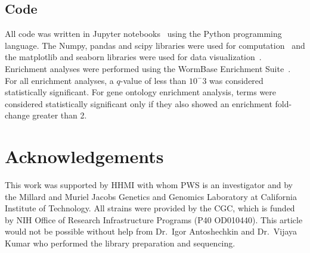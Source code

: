 \documentclass[10pt, twocolumn]{article}
\begin{document}
\subsection*{Code}
All code was written in Jupyter notebooks~\cite{Perez2007} using the Python
programming language. The Numpy, pandas and scipy libraries were used for
computation~\cite{VanDerWalt2011,McKinney2011,Oliphant2007} and the matplotlib
and seaborn libraries were used for data visualization~\cite{Hunter2007,Waskom}.
Enrichment analyses were performed using the WormBase Enrichment
Suite~\cite{Angeles-Albores2016}. For all enrichment analyses, a $q$-value of
less than $10^-3$ was considered statistically significant. For gene ontology
enrichment analysis, terms were considered statistically significant only if
they also showed an enrichment fold-change greater than 2.

\section*{Acknowledgements}
This work was supported by HHMI with whom PWS is an investigator and by the
Millard and Muriel Jacobs Genetics and Genomics Laboratory at California
Institute of Technology. All strains were provided by the CGC, which is funded
by NIH Office of Research Infrastructure Programs (P40 OD010440). This article
would not be possible without help from Dr.\ Igor Antoshechkin and Dr.\ Vijaya
Kumar who performed the library preparation and sequencing.



\end{document}

